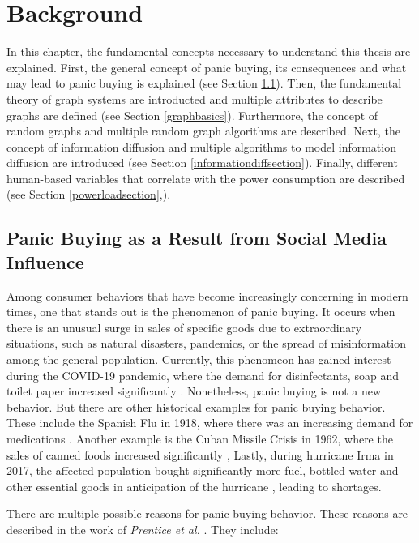 \chapter{Background}
\label{background}

In this chapter, the fundamental concepts necessary to understand 
this thesis are explained.
First, the general concept of panic buying,
its consequences and what may lead to panic buying is explained 
(see Section \ref{panicbuying}).
Then, the fundamental theory of graph systems are 
introducted and multiple attributes to describe graphs are defined 
(see Section \ref{graphbasics}).
Furthermore, the concept of random graphs and multiple random 
graph algorithms are described.
Next, the concept of information diffusion
and multiple algorithms to model information diffusion are introduced
(see Section \ref{informationdiffsection}).
Finally, different human-based variables that 
correlate with the power consumption are described
(see Section \ref{powerloadsection},).


\section{Panic Buying as a Result from Social Media Influence}
\label{panicbuying}

Among consumer behaviors that have become increasingly concerning in modern times, 
one that stands out is the phenomenon of panic buying.
It occurs when there is an unusual surge in sales of 
specific goods due to extraordinary situations, such as natural disasters, 
pandemics, or the spread of misinformation among the general population.
Currently, this phenomeon has gained interest during the COVID-19 pandemic,
where the demand for disinfectants, soap and toilet paper increased significantly
\cite{covidpanicbuying}. Nonetheless, panic buying is not a new behavior.
But there are other historical examples for panic buying behavior.
These include the Spanish Flu
in 1918, where there was an increasing demand for medications 
\cite{honigsbaum2013regulating}. Another example is the Cuban Missile Crisis 
in 1962, where the sales of canned foods increased significantly \cite{george2004awaiting}, 
Lastly, during hurricane Irma in 2017, the affected population bought
significantly more fuel, bottled water 
and other essential goods in anticipation of the hurricane \cite{irmahurricane},
leading to shortages.

There are multiple possible reasons for panic buying behavior. These reasons 
are described in the work of \textit{Prentice et al.}
\cite{prentice2022antecedents}. They include:

